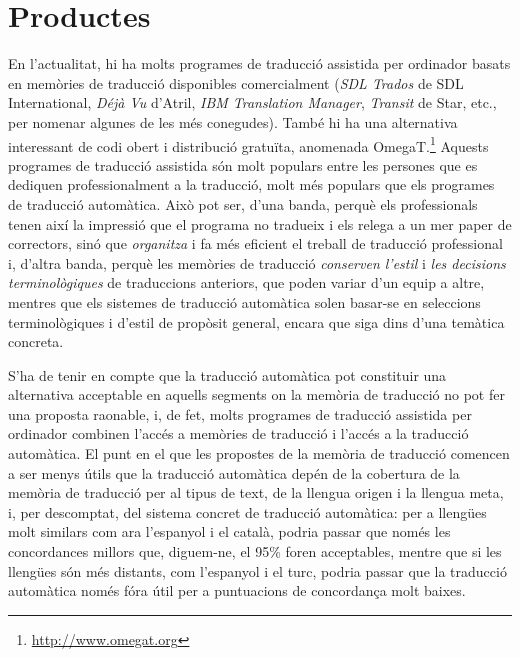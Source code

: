 


\section{Productes}

En l'actualitat, hi ha molts programes de traducció assistida per
ordinador basats en memòries de traducció disponibles comercialment
(\emph{SDL Trados} de SDL International, \emph{Déjà Vu} d'Atril,
\emph{IBM Translation Manager}, \emph{Transit} de Star, etc., per
nomenar algunes de les més conegudes). També hi ha una alternativa
interessant de codi obert i distribució gratuïta, anomenada
OmegaT.\footnote{\url{http://www.omegat.org}} Aquests programes de
traducció assistida són molt populars entre les persones que es
dediquen professionalment a la traducció, molt més populars que els
programes de traducció automàtica. Això pot ser, d'una banda, perquè
els professionals tenen així la impressió que el programa no tradueix
i els relega a un mer paper de correctors, sinó que \emph{organitza} i
fa més eficient el treball de traducció professional i, d'altra banda,
perquè les memòries de traducció \emph{conserven l'estil} i \emph{les
  decisions terminològiques} de traduccions anteriors, que poden
variar d'un equip a altre, mentres que els sistemes de traducció
automàtica solen basar-se en seleccions terminològiques i d'estil de
propòsit general, encara que siga dins d'una temàtica concreta.

S'ha de tenir en compte que la traducció automàtica pot constituir una
alternativa acceptable en aquells segments on la memòria de traducció
no pot fer una proposta raonable, i, de fet, molts programes de
traducció assistida per ordinador combinen l'accés a memòries de
traducció i l'accés a la traducció automàtica. El punt en el que les
propostes de la memòria de traducció comencen a ser menys útils que la
traducció automàtica depén de la cobertura de la memòria de traducció
per al tipus de text, de la llengua origen i la llengua meta, i, per
descomptat, del sistema concret de traducció automàtica: per a
llengües molt similars com ara l'espanyol i el català, podria passar
que només les concordances millors que, diguem-ne, el 95\% foren
acceptables, mentre que si les llengües són més distants, com
l'espanyol i el turc, podria passar que la traducció automàtica només
fóra útil per a puntuacions de concordança molt baixes.

